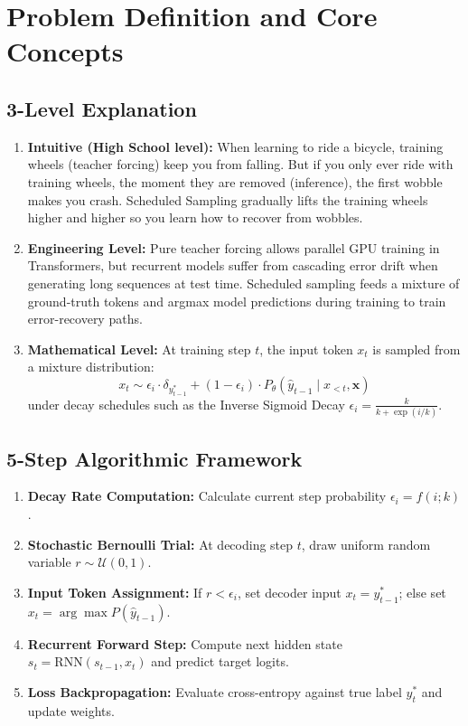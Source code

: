 \documentclass[11pt,a4paper]{article}
\theoremstyle{definition}
\begin{document}
\section{Problem Definition and Core Concepts}

\subsection{3-Level Explanation}
\begin{enumerate}
    \item \textbf{Intuitive (High School level):} When learning to ride a bicycle, training wheels (teacher forcing) keep you from falling. But if you only ever ride with training wheels, the moment they are removed (inference), the first wobble makes you crash. Scheduled Sampling gradually lifts the training wheels higher and higher so you learn how to recover from wobbles.
    \item \textbf{Engineering Level:} Pure teacher forcing allows parallel GPU training in Transformers, but recurrent models suffer from cascading error drift when generating long sequences at test time. Scheduled sampling feeds a mixture of ground-truth tokens and argmax model predictions during training to train error-recovery paths.
    \item \textbf{Mathematical Level:} At training step $t$, the input token $x_t$ is sampled from a mixture distribution:
    \begin{equation}
    x_t \sim \epsilon_i \cdot \delta_{y_{t-1}^*} + (1 - \epsilon_i) \cdot P_\theta(\hat{y}_{t-1} \mid x_{<t}, \mathbf{x})
    \end{equation}
    under decay schedules such as the Inverse Sigmoid Decay $\epsilon_i = \frac{k}{k + \exp(i/k)}$.
\end{enumerate}

\subsection{5-Step Algorithmic Framework}
\begin{enumerate}
    \item \textbf{Decay Rate Computation:} Calculate current step probability $\epsilon_i = f(i; k)$.
    \item \textbf{Stochastic Bernoulli Trial:} At decoding step $t$, draw uniform random variable $r \sim \mathcal{U}(0, 1)$.
    \item \textbf{Input Token Assignment:} If $r < \epsilon_i$, set decoder input $x_t = y_{t-1}^*$; else set $x_t = \arg\max P(\hat{y}_{t-1})$.
    \item \textbf{Recurrent Forward Step:} Compute next hidden state $s_t = \text{RNN}(s_{t-1}, x_t)$ and predict target logits.
    \item \textbf{Loss Backpropagation:} Evaluate cross-entropy against true label $y_t^*$ and update weights.
\end{enumerate}
\end{document}
